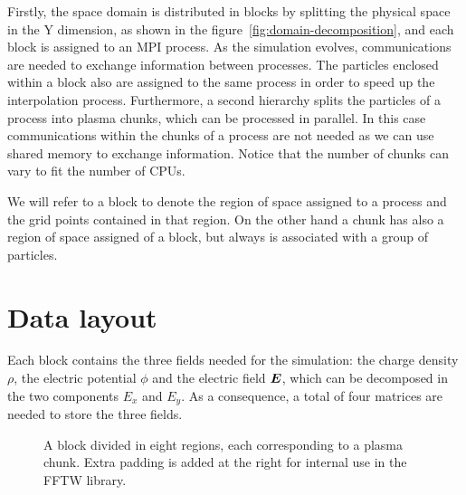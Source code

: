 Firstly, the space domain is distributed in blocks by splitting the physical 
space in the Y dimension, as shown in the figure~\ref{fig:domain-decomposition}, 
and each block is assigned to an MPI process. As the simulation evolves, 
communications are needed to exchange information between processes. The 
particles enclosed within a block also are assigned to the same process in order 
to speed up the interpolation process. Furthermore, a second hierarchy splits 
the particles of a process into plasma chunks, which can be processed in 
parallel. In this case communications within the chunks of a process are not 
needed as we can use shared memory to exchange information. Notice that the 
number of chunks can vary to fit the number of CPUs.

We will refer to a block to denote the region of space assigned to a process and 
the grid points contained in that region. On the other hand a chunk has also a 
region of space assigned of a block, but always is associated with a group of 
particles.

\section{Data layout}

Each block contains the three fields needed for the simulation: the charge 
density $\rho$, the electric potential $\phi$ and the electric field $\bm{E}$, which 
can be decomposed in the two components $E_x$ and $E_y$. As a consequence, a 
total of four matrices are needed to store the three fields.

\begin{figure}[h]%
\centering
{}
\caption{A block divided in eight regions, each corresponding to a plasma chunk.  
Extra padding is added at the right for internal use in the FFTW library.}
\label{fig:block}
\end{figure}%

